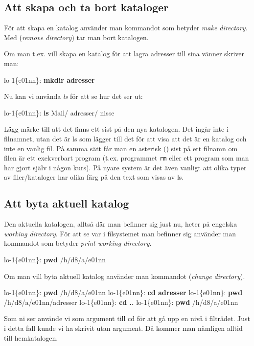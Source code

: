 \documentclass[a4paper,twocolumn]{book}
\begin{document}
\subsection{Att skapa och ta bort kataloger}

För att skapa en katalog använder man kommandot
 som betyder \emph{make directory}. Med 
(\emph{remove directory}) tar man bort katalogen.

Om man t.ex. vill skapa en katalog för att lagra adresser till sina
vänner skriver man:
\begin{example}
  lo-1\{e01nn\}: \textbf{mkdir adresser}
\end{example}
Nu kan vi använda \emph{ls} för att se hur det ser ut:
\begin{example}
  lo-1\{e01nn\}: \textbf{ls}
  Mail/      adresser/  nisse
\end{example}
Lägg märke till att det finns ett
\hidettindex{/} sist på den nya katalogen. Det
ingår inte i filnamnet, utan det är ls som lägger till det för att
visa att det är en katalog och inte en vanlig fil. På samma sätt får
man en asterisk (\ttindex{*}) sist på ett filnamn om filen är
ett exekverbart program (t.ex. programmet \texttt{rm} eller ett program
som man har gjort själv i någon kurs).
På nyare system är det även vanligt att olika typer av filer/kataloger
har olika färg på den text som visas av ls.

\subsection{Att byta aktuell katalog}

Den aktuella katalogen,
alltså där man befinner sig just nu, heter på engelska \emph{working directory}.
För att se var i filsystemet man befinner sig använder man kommandot 
som betyder \emph{print working directory}.
\begin{example}
  lo-1\{e01nn\}: \textbf{pwd}
  /h/d8/a/e01nn
\end{example}

Om man vill byta aktuell katalog använder man kommandot 
(\emph{change directory}).
\begin{example}
  lo-1\{e01nn\}: \textbf{pwd}
  /h/d8/a/e01nn
  lo-1\{e01nn\}: \textbf{cd adresser}
  lo-1\{e01nn\}: \textbf{pwd}
  /h/d8/a/e01nn/adresser
  lo-1\{e01nn\}: \textbf{cd ..}
  lo-1\{e01nn\}: \textbf{pwd}
  /h/d8/a/e01nn
\end{example}
Som ni ser använde vi  som argument till cd för att gå upp en
nivå i filträdet. Just i detta fall kunde vi ha skrivit  utan
argument. Då kommer man nämligen alltid till hemkatalogen.
\end{document}
